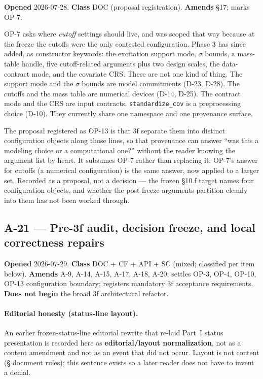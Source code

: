\documentclass[
  10pt,
]{article}
\begin{document}
\textbf{Opened} 2026-07-28. \textbf{Class} DOC (proposal registration). \textbf{Amends} §17; marks OP-7.

OP-7 asks where \emph{cutoff} settings should live, and was scoped that way because at the freeze the cutoffs were the only contested configuration. Phase 3 has since added, as constructor keywords: the excitation support mode, \(\sigma\) bounds, a mass-table handle, five cutoff-related arguments plus two design scales, the data-contract mode, and the covariate CRS. These are not one kind of thing. The support mode and the \(\sigma\) bounds are model commitments (D-23, D-28). The cutoffs and the mass table are numerical devices (D-14, D-25). The contract mode and the CRS are input contracts. \texttt{standardize\_cov} is a preprocessing choice (D-10). They currently share one namespace and one provenance surface.

The proposal registered as OP-13 is that 3f separate them into distinct configuration objects along those lines, so that provenance can answer ``was this a modeling choice or a computational one?'' without the reader knowing the argument list by heart. It subsumes OP-7 rather than replacing it: OP-7's answer for cutoffs (a numerical configuration) is the same answer, now applied to a larger set. Recorded as a proposal, not a decision --- the frozen §10.f target names four configuration objects, and whether the post-freeze arguments partition cleanly into them has not been worked through.

\hypertarget{a-21}{%
\subsection{A-21 --- Pre-3f audit, decision freeze, and local correctness repairs}\label{a-21}}

\textbf{Opened} 2026-07-29. \textbf{Class} DOC + CF + API + SC (mixed; classified per item below). \textbf{Amends} A-9, A-14, A-15, A-17, A-18, A-20; settles OP-3, OP-4, OP-10, OP-13 configuration boundary; registers mandatory 3f acceptance requirements. \textbf{Does not begin} the broad 3f architectural refactor.

\paragraph{Editorial honesty (status-line layout).}
An earlier frozen-status-line editorial rewrite that re-laid Part~I status presentation is recorded here as \textbf{editorial/layout normalization}, not as a content amendment and not as an event that did not occur. Layout is not content (§ document rules); this sentence exists so a later reader does not have to invent a denial.
\end{document}
